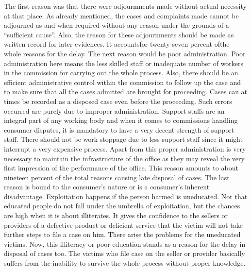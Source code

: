 \begin{multicols}{2}
\noi
The first reason was that there were adjournments made without actual necessity at that place.
As already mentioned, the cases and complaints made cannot be adjourned as and when
required without any reason under the grounds of a “sufficient cause”. Also, the reason for
these adjournments should be made as written record for later evidences. It accountsfor twenty-seven percent ofthe whole reasons for the delay. The next reason would be poor administration.
Poor administration here means the less skilled staff or inadequate number of workers in the
commission for carrying out the whole process. Also, there should be an efficient
administrative control within the commission to follow up the case and to make sure that all
the cases admitted are brought for proceeding. Cases can at times be recorded as a disposed
case even before the proceeding. Such errors occurred are purely due to improper
administration. Support staffs are an integral part of any working body and when it comes to
commissions handling consumer disputes, it is mandatory to have a very decent strength of
support staff. There should not be work stoppage due to less support staff since it might
interrupt a very expensive process. Apart from this proper administration is very necessary to
maintain the infrastructure of the office as they may reveal the very first impression of the
performance of the office. This reason amounts to about nineteen percent of the total reasons
causing late disposal of cases. The last reason is bound to the consumer’s nature or is a
consumer’s inherent disadvantage. Exploitation happens if the person harmed is uneducated.
Not that educated people do not fall under the umbrella of exploitation, but the chances are
high when it is about illiterates. It gives the confidence to the sellers or providers of a defective
product or deficient service that the victim will not take further steps to file a case on him.
There arise the problems for the uneducated victims. Now, this illiteracy or poor education
stands as a reason for the delay in disposal of cases too. The victims who file case on the seller
or provider basically suffers from the inability to survive the whole process without proper
knowledge.


\end{multicols}
